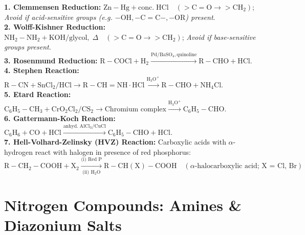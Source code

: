 \documentclass[10pt,a4paper]{article}
\begin{document}
\begin{formulabox}
\textbf{1. Clemmensen Reduction:} $\mathrm{Zn-Hg} + \mathrm{conc.\; HCl} \quad (\mathrm{>C=O} \to \mathrm{>CH_2})$; \textit{Avoid if acid-sensitive groups (e.g. $-\mathrm{OH}, -\mathrm{C=C}-, -\mathrm{OR}$) present}.\\
\textbf{2. Wolff-Kishner Reduction:} $\mathrm{NH_2-NH_2} + \mathrm{KOH} / \text{glycol},\; \Delta \quad (\mathrm{>C=O} \to \mathrm{>CH_2})$; \textit{Avoid if base-sensitive groups present}.\\
\textbf{3. Rosenmund Reduction:} $\mathrm{R-COCl} + \mathrm{H_2} \xrightarrow{\mathrm{Pd / BaSO_4, quinoline}} \mathrm{R-CHO} + \mathrm{HCl}$.\\
\textbf{4. Stephen Reaction:} $\mathrm{R-CN} + \mathrm{SnCl_2 / HCl} \longrightarrow \mathrm{R-CH=NH\cdot HCl} \xrightarrow{\mathrm{H_3O^+}} \mathrm{R-CHO} + \mathrm{NH_4Cl}$.\\
\textbf{5. Etard Reaction:} $\mathrm{C_6H_5-CH_3} + \mathrm{CrO_2Cl_2 / CS_2} \to \text{Chromium complex} \xrightarrow{\mathrm{H_3O^+}} \mathrm{C_6H_5-CHO}$.\\
\textbf{6. Gattermann-Koch Reaction:} $\mathrm{C_6H_6} + \mathrm{CO} + \mathrm{HCl} \xrightarrow{\mathrm{anhyd.\; AlCl_3 / CuCl}} \mathrm{C_6H_5-CHO} + \mathrm{HCl}$.\\
\textbf{7. Hell-Volhard-Zelinsky (HVZ) Reaction:}
Carboxylic acids with $\alpha$-hydrogen react with halogen in presence of red phosphorus:
\begin{equation}
  \mathrm{R-CH_2-COOH} + \mathrm{X_2} \xrightarrow[\text{(ii) } \mathrm{H_2O}]{\text{(i) Red P}} \mathrm{R-CH(X)-COOH} \quad (\alpha\text{-halocarboxylic acid; X = Cl, Br})
\end{equation}
\end{formulabox}

\section{Nitrogen Compounds: Amines \& Diazonium Salts}
\end{document}
